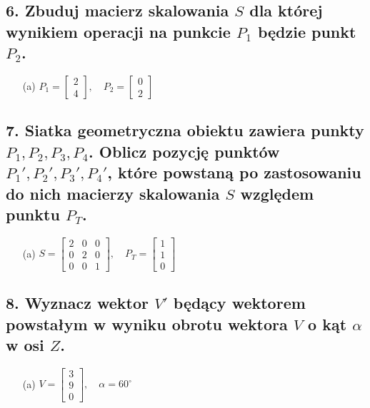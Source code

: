 \subsection*{6. Zbuduj macierz skalowania \( S \) dla której wynikiem operacji na punkcie \( P_1 \) będzie punkt \( P_2 \).}

\begin{enumerate}
    \item[(a)] \( P_1 = \begin{bmatrix} 2 \\ 4 \end{bmatrix}, \quad
    P_2 = \begin{bmatrix} 0 \\ 2 \end{bmatrix} \)
\end{enumerate}

\subsection*{7. Siatka geometryczna obiektu zawiera punkty \( P_1, P_2, P_3, P_4 \). Oblicz pozycję punktów \( P_1', P_2', P_3', P_4' \), które powstaną po zastosowaniu do nich macierzy skalowania \( S \) względem punktu \( P_T \).}

\begin{enumerate}
    \item[(a)] \( S = \begin{bmatrix} 2 & 0 & 0 \\ 0 & 2 & 0 \\ 0 & 0 & 1 \end{bmatrix}, \quad
    P_T = \begin{bmatrix} 1 \\ 1 \\ 0 \end{bmatrix} \)
\end{enumerate}

\subsection*{8. Wyznacz wektor \( V' \) będący wektorem powstałym w wyniku obrotu wektora \( V \) o kąt \( \alpha \) w osi \( Z \).}

\begin{enumerate}
    \item[(a)] \( V = \begin{bmatrix} 3 \\ 9 \\ 0 \end{bmatrix}, \quad \alpha = 60^\circ \)
\end{enumerate}

